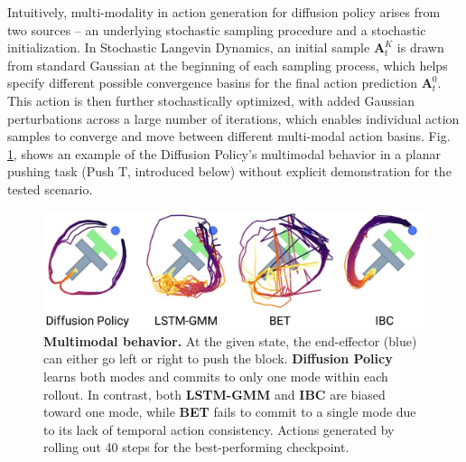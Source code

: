 \documentclass[Afour,sageh,times]{sagej}
\newcommand\todo[1]{\textcolor{red}{[TODO: #1]}}
\begin{document}
Intuitively, multi-modality in action generation for diffusion policy arises from two sources -- an underlying stochastic sampling procedure and a stochastic initialization. In Stochastic Langevin Dynamics, an initial sample $\mathbf{A}^K_t$ is drawn from standard Gaussian at the beginning of each sampling process, which helps specify different possible convergence basins for the final action prediction $\mathbf{A}^0_t$. This action is then further stochastically optimized, with added Gaussian perturbations across a large number of iterations, which enables individual action samples to converge and move between different multi-modal action basins.
Fig. \ref{fig:multimodal}, shows an example of the Diffusion Policy's multimodal behavior in a planar pushing task (Push T, introduced below) without explicit demonstration for the tested scenario. 

\begin{figure}[h]
\centering
\includegraphics[width=0.98\linewidth]{figure/multimodal_sim.pdf} %

\caption{\label{fig:multimodal} 
\textbf{Multimodal behavior.} At the given state, the end-effector (blue) can either go left or right to push the block.
\textbf{Diffusion Policy} learns both modes and commits to only one mode within each rollout.  
In contrast, both \textbf{LSTM-GMM} \cite{robomimic} and \textbf{IBC} \cite{ibc} are biased toward one mode, while \textbf{BET} \cite{bet} fails to commit to a single mode due to its lack of temporal action consistency. 
Actions generated by rolling out 40 steps for the best-performing checkpoint. 
}
\vspace{-2mm}
\end{figure}
\end{document}
